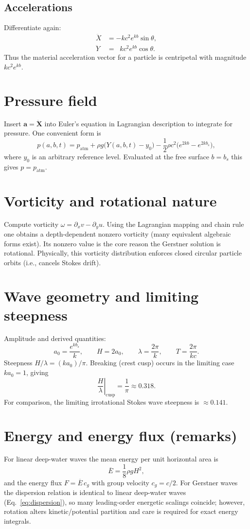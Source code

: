 \documentclass[11pt]{article}
\begin{document}
\subsection{Accelerations}
Differentiate again:
\begin{align}
\ddot X &= -k c^2 e^{k b}\sin\theta, \\
\ddot Y &= \;\;k c^2 e^{k b}\cos\theta.
\end{align}
Thus the material acceleration vector for a particle is centripetal with magnitude $k c^2 e^{k b}$.

\section{Pressure field}
Insert $\mathbf{a}=\ddot{\mathbf{X}}$ into Euler's equation in Lagrangian description to integrate for pressure. One convenient form is
\begin{equation}\label{eq:pressure}
p(a,b,t) = p_{\mathrm{atm}} + \rho g\big(Y(a,b,t)-y_0\big) - \frac{1}{2}\rho c^2\big(e^{2k b}-e^{2k b_s}\big),
\end{equation}
where $y_0$ is an arbitrary reference level. Evaluated at the free surface $b=b_s$ this gives $p=p_{\mathrm{atm}}$.

\section{Vorticity and rotational nature}
Compute vorticity $\omega=\partial_x v - \partial_y u$. Using the Lagrangian mapping and chain rule one obtains a depth-dependent nonzero vorticity (many equivalent algebraic forms exist). Its nonzero value is the core reason the Gerstner solution is rotational. Physically, this vorticity distribution enforces closed circular particle orbits (i.e., cancels Stokes drift).

\section{Wave geometry and limiting steepness}
Amplitude and derived quantities:
\[
a_0=\frac{e^{kb_s}}{k},\qquad H=2a_0,\qquad \lambda=\frac{2\pi}{k},\qquad T=\frac{2\pi}{kc}.
\]
Steepness $H/\lambda = (k a_0)/\pi$. Breaking (crest cusp) occurs in the limiting case $k a_0=1$, giving
\[
\left.\frac{H}{\lambda}\right|_{\text{cusp}} = \frac{1}{\pi}\approx 0.318.
\]
For comparison, the limiting irrotational Stokes wave steepness is $\approx 0.141$.

\section{Energy and energy flux (remarks)}
For linear deep-water waves the mean energy per unit horizontal area is
\[
\overline{E} = \frac{1}{8}\rho g H^2,
\]
and the energy flux $F=\overline{E}\,c_g$ with group velocity $c_g=c/2$. For Gerstner waves the dispersion relation is identical to linear deep-water waves (Eq.~\ref{eq:dispersion}), so many leading-order energetic scalings coincide; however, rotation alters kinetic/potential partition and care is required for exact energy integrals.
\end{document}
